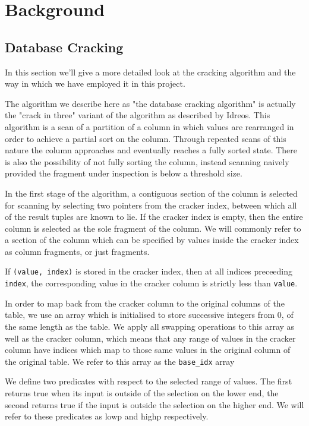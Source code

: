 \chapter{Background}

\label{ch:background}

\section{Database Cracking}

In this section we'll give a more detailed look at the cracking algorithm and the way in which we
have employed it in this project.

The algorithm we describe here as "the database cracking algorithm" is actually the "crack in three"
variant of the algorithm as described by Idreos. This algorithm is a scan of a partition of a column in which values are rearranged in order to achieve a partial sort on the column. Through repeated
scans of this nature the column approaches and eventually reaches a fully sorted state. There is also
the possibility of not fully sorting the column, instead scanning naively provided the fragment
under inspection is below a threshold size.

In the first stage of the algorithm, a contiguous section of the column is selected for scanning by
selecting two pointers from the cracker index, between which all of the result tuples are known to
lie. If the cracker index is empty, then the entire column is selected as the sole fragment of the
column. We will commonly refer to a section of the column which can be specified by values inside the cracker index as column fragments, or just fragments.

If \texttt{(value, index)} is stored in the cracker index, then at all indices preceeding
\texttt{index}, the corresponding value in the cracker column is strictly less than \texttt{value}.

In order to map back from the cracker column to the original columns of the table, we use an array
which is initialised to store successive integers from 0, of the same length as the table. We apply
all swapping operations to this array as well as the cracker column, which means that any range of
values in the cracker column have indices which map to those same values in the original column of
the original table. We refer to this array as the \texttt{base\_idx} array

We define two predicates with respect to the selected range of values. The first returns true when
its input is outside of the selection on the lower end, the second returns true if the input is
outside the selection on the higher end. We will refer to these predicates as lowp and highp
respectively.

